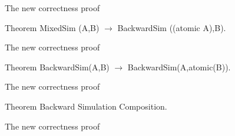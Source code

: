 %
%
%
%
\begin{frame}{The new correctness proof}
  \proofmixed
  \vfill
  \begin{block}{Theorem}
    MixedSim (A,B) $\rightarrow$ BackwardSim ((atomic A),B).
  \end{block}
\end{frame}

\begin{frame}[noframenumbering]{The new correctness proof}
  \proofmixedbwd
  \vfill
  \begin{block}{Theorem}
    BackwardSim(A,B) $\rightarrow$ BackwardSim(A,atomic(B)).
  \end{block}
\end{frame}

\begin{frame}[noframenumbering]{The new correctness proof}
  \proofatbwd
  \vfill
  \begin{block}{Theorem}
    Backward Simulation Composition.
  \end{block}
\end{frame}

\begin{frame}[noframenumbering]{The new correctness proof}
  \prooffinal
\end{frame}

